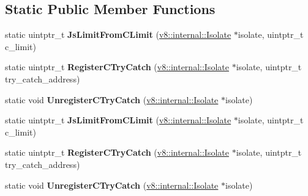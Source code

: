 \subsection*{Static Public Member Functions}
\begin{DoxyCompactItemize}
\item 
static uintptr\+\_\+t {\bfseries Js\+Limit\+From\+C\+Limit} (\hyperlink{classv8_1_1internal_1_1_isolate}{v8\+::internal\+::\+Isolate} $\ast$isolate, uintptr\+\_\+t c\+\_\+limit)\hypertarget{classv8_1_1internal_1_1_simulator_stack_af21f3a7909fe2ca5760b1cfe192f9fef}{}\label{classv8_1_1internal_1_1_simulator_stack_af21f3a7909fe2ca5760b1cfe192f9fef}

\item 
static uintptr\+\_\+t {\bfseries Register\+C\+Try\+Catch} (\hyperlink{classv8_1_1internal_1_1_isolate}{v8\+::internal\+::\+Isolate} $\ast$isolate, uintptr\+\_\+t try\+\_\+catch\+\_\+address)\hypertarget{classv8_1_1internal_1_1_simulator_stack_a6f431175b70dcc1afd95dcc3bc9905a7}{}\label{classv8_1_1internal_1_1_simulator_stack_a6f431175b70dcc1afd95dcc3bc9905a7}

\item 
static void {\bfseries Unregister\+C\+Try\+Catch} (\hyperlink{classv8_1_1internal_1_1_isolate}{v8\+::internal\+::\+Isolate} $\ast$isolate)\hypertarget{classv8_1_1internal_1_1_simulator_stack_aba310aee87eed385313d42cbc30dcd8a}{}\label{classv8_1_1internal_1_1_simulator_stack_aba310aee87eed385313d42cbc30dcd8a}

\item 
static uintptr\+\_\+t {\bfseries Js\+Limit\+From\+C\+Limit} (\hyperlink{classv8_1_1internal_1_1_isolate}{v8\+::internal\+::\+Isolate} $\ast$isolate, uintptr\+\_\+t c\+\_\+limit)\hypertarget{classv8_1_1internal_1_1_simulator_stack_af21f3a7909fe2ca5760b1cfe192f9fef}{}\label{classv8_1_1internal_1_1_simulator_stack_af21f3a7909fe2ca5760b1cfe192f9fef}

\item 
static uintptr\+\_\+t {\bfseries Register\+C\+Try\+Catch} (\hyperlink{classv8_1_1internal_1_1_isolate}{v8\+::internal\+::\+Isolate} $\ast$isolate, uintptr\+\_\+t try\+\_\+catch\+\_\+address)\hypertarget{classv8_1_1internal_1_1_simulator_stack_a6f431175b70dcc1afd95dcc3bc9905a7}{}\label{classv8_1_1internal_1_1_simulator_stack_a6f431175b70dcc1afd95dcc3bc9905a7}

\item 
static void {\bfseries Unregister\+C\+Try\+Catch} (\hyperlink{classv8_1_1internal_1_1_isolate}{v8\+::internal\+::\+Isolate} $\ast$isolate)\hypertarget{classv8_1_1internal_1_1_simulator_stack_aba310aee87eed385313d42cbc30dcd8a}{}\label{classv8_1_1internal_1_1_simulator_stack_aba310aee87eed385313d42cbc30dcd8a}


\end{DoxyCompactItemize}
